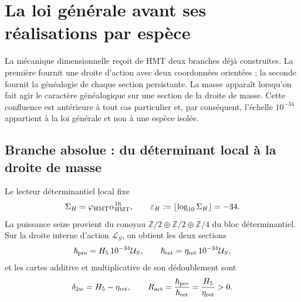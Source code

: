 \section{La loi générale avant ses réalisations par espèce}
\label{sec:ley-general-masa-accion-autonoma}

La mécanique dimensionnelle reçoit de HMT deux branches déjà construites. La première
fournit une droite d'action avec deux coordonnées orientées ; la seconde
fournit la généalogie de chaque section persistante. La masse apparaît lorsqu'on
fait agir le caractère généalogique sur une section de la droite de masse.
Cette confluence est antérieure à tout cas particulier et, par conséquent,
l'échelle \(10^{-34}\) appartient à la loi générale et non à une espèce isolée.

\subsection{Branche absolue : du déterminant local à la droite de masse}

Le lecteur déterminantiel local fixe
\begin{equation}
 \Sigma_H=\varphi_{\rm HMT}\alpha_{\rm HMT}^{16},
 \qquad \varepsilon_H:=\left\lfloor\log_{10}\Sigma_H\right\rfloor=-34 .
 \label{eq:ley-masa-sigma-menos34-autonoma}
\end{equation}
La puissance seize provient du conoyau
\(
 \mathbb Z/2\oplus\mathbb Z/2\oplus\mathbb Z/4
\)
du bloc déterminantiel. Sur la droite interne d'action
\(\mathcal L_S\), on obtient les deux sections
\begin{equation}
 \boldsymbol\hbar_{\rm pre}
 =H_5\,10^{-34}\mathcal U_S,
 \qquad
 \boldsymbol\hbar_{\rm ret}
 =\eta_{\rm ret}\,10^{-34}\mathcal U_S,
 \label{eq:ley-masa-hbar-pre-ret-autonoma}
\end{equation}
et les cartes additive et multiplicative de son dédoublement sont
\begin{equation}
 \delta_{2w}=H_5-\eta_{\rm ret},
 \qquad
 R_{\rm act}
 =\frac{\boldsymbol\hbar_{\rm pre}}
        {\boldsymbol\hbar_{\rm ret}}
 =\frac{H_5}{\eta_{\rm ret}}>0 .
 \label{eq:ley-masa-razon-accion-autonoma}
\end{equation}

